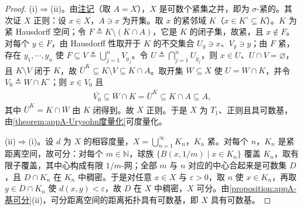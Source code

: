 \documentclass[../main.tex]{subfiles}
\begin{document}
\begin{proof}
(i)$\Rightarrow$(ii)。由\hyperref[remark:appA-可数基局部紧]{注记}（取 $A=X$），$X$ 是可数个紧集之并，即为 $\sigma$-紧的。其次证 $X$ 正则：设 $x\in X$，$A\ni x$ 为开集。取 $x$ 的紧邻域 $K$（$x\in K^\circ\subseteq K$）。$K$ 为紧 Hausdorff 空间；令 $F\triangleq K\setminus(K\cap A)$，它是 $K$ 的闭子集，故紧，且 $x\notin F$。对每个 $y\in F$，由 Hausdorff 性取开于 $K$ 的不交集合 $U_y\ni x$、$V_y\ni y$；由 $F$ 紧，存在 $y_1,\cdots ,y_n$ 使 $F\subseteq V\triangleq\bigcup_{j=1}^nV_{y_j}$。令 $U\triangleq\bigcap_{j=1}^nU_{y_j}$，则 $x\in U$、$U\cap V=\varnothing$，且 $K\setminus V$ 闭于 $K$，故 $\overline{U}^K\subseteq K\setminus V\subseteq K\cap A$。取开集 $W\subseteq X$ 使 $U=W\cap K$，并令 $V_0\triangleq W\cap K^\circ$；则 $x\in V_0$ 且
\begin{align*}
\overline{V_0}\subseteq\overline{W}\cap K=\overline{U}^K\subseteq K\cap A\subseteq A,
\end{align*}
其中 $\overline{U}^K=K\cap\overline{W}$ 由 $K$ 闭得到。故 $X$ 正则。于是 $X$ 为 $T_1$、正则且具可数基，由\cref{theorem:appA-Urysohn度量化}可度量化。

(ii)$\Rightarrow$(i)。设 $d$ 为 $X$ 的相容度量，$X=\bigcup_{n=1}^\infty K_n$，$K_n$ 紧。对每个 $n$，$K_n$ 是紧距离空间，故可分：对每个 $m\in\mathbb{N}$，球族 $\{B(x,1/m)\mid x\in K_n\}$ 覆盖 $K_n$，取有限子覆盖，其中心构成有限 $1/m$-网；全部 $m$ 与 $n$ 对应的中心合起来是可数集 $D$，且 $D\cap K_n$ 在 $K_n$ 中稠密。于是对任意 $x\in X$ 与 $\varepsilon>0$，取 $n$ 使 $x\in K_n$，再取 $y\in D\cap K_n$ 使 $d(x,y)<\varepsilon$，故 $D$ 在 $X$ 中稠密，$X$ 可分。由\cref{proposition:appA-基可分}(ii)，可分距离空间的距离拓扑具有可数基，即 $X$ 具有可数基。
\end{proof}
\end{document}
